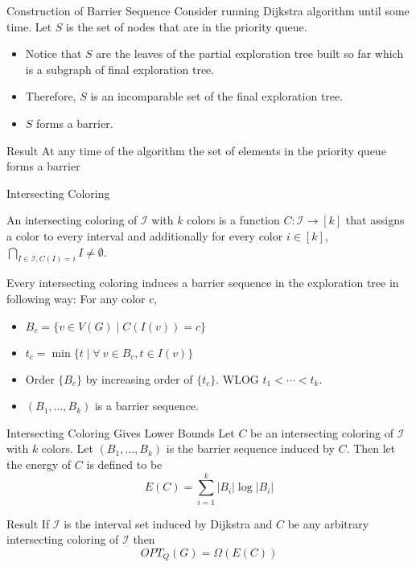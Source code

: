 \documentclass[10pt]{beamer}
\begin{document}
\begin{frame}{Construction of Barrier Sequence}
    Consider running Dijkstra algorithm until some time. Let $S$ is the set of nodes that are in the priority queue. 
    \begin{itemize}
        \item Notice that $S$ are the leaves of the partial exploration tree built so far which is a subgraph of final exploration tree.
        \item Therefore, $S$ is an incomparable set of the final exploration tree.
        \item $S$ forms a barrier. 
    \end{itemize}\vfill

    \begin{alertblock}{Result}
		At any time of the algorithm the set of elements in the priority queue forms a barrier
	\end{alertblock}
\end{frame}
\begin{frame}{Intersecting Coloring}
    \begin{definition}
      An intersecting coloring of $\mathcal{I}$ with $k$ colors is a function $C:\mathcal{I}\to [k]$ that assigns a color to every interval and additionally for every color $i\in[k]$, $\bigcap\limits_{I\in\mathcal{I}, C(I)=i}I\neq \emptyset$.
    \end{definition}\vfill

    Every intersecting coloring induces a barrier sequence in the exploration tree in following way: For any color $c$, \begin{itemize}
        \item  $B_c=\{v\in V(G)\mid C(I(v))=c\}$
        \item $t_c=\min\{t\mid \forall\ v\in B_c, t\in I(v)\}$
        \item Order $\{B_c\}$ by increasing order of $\{t_c\}$. WLOG $t_1<\cdots <t_k$. 
        \item $(B_1,\dots, B_k)$ is a barrier sequence.
    \end{itemize}
\end{frame}

\begin{frame}{Intersecting Coloring Gives Lower Bounds}
    Let $C$ be an intersecting coloring of $\mathcal{I}$ with $k$ colors. 
    Let $(B_1,\dots, B_k)$ is the barrier sequence induced by $C$. Then let the energy of $C$ is defined to be $$E(C)=\sum\limits_{i=1}^k|B_i|\log |B_i|$$
\vfill

    \begin{alertblock}{Result}
		If $\mathcal{I}$ is the interval set induced by Dijkstra and $C$ be any arbitrary intersecting coloring of $\mathcal{I}$ then $$OPT_Q(G)=\Omega(E(C))$$
	\end{alertblock}
\end{frame}
\end{document}
